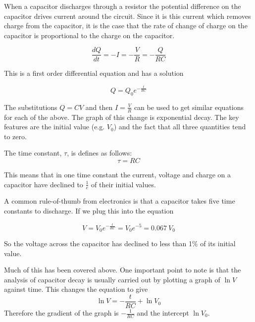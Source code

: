 \documentclass[revision-guide.tex]{subfiles}
\begin{document}

When a capacitor discharges through a resistor the potential difference on the capacitor drives current around the circuit. Since it is this current which removes charge from the capacitor, it is the case that the rate of change of charge on the capacitor is proportional to the charge on the capacitor.

\[ \frac{dQ}{dt} = -I = -\frac{V}{R} = -\frac{Q}{RC} \]

This is a first order differential equation and has a solution

\[ Q = Q_0 e^{-\frac{t}{RC}} \]

The substitutions $Q=CV$ and then $I = \frac{V}{R}$ can be used to get similar equations for each of the above. The graph of this change is exponential decay. The key features are the initial value (e.g. $V_0$) and the fact that all three quantities tend to zero.


The time constant, $\tau$, is defines as follows:
\[ \tau = RC \]

This means that in one time constant the current, voltage and charge on a capacitor have declined to $\frac{1}{e}$ of their initial values.

A common rule-of-thumb from electronics is that a capacitor takes five time constants to discharge. If we plug this into the equation

\[ V = V_0 e^{-\frac{t}{RC}} = V_0 e^{-5} = 0.067\ V_0 \]

So the voltage across the capacitor has declined to less than 1\% of its initial value.


Much of this has been covered above. One important point to note is that the analysis of capacitor decay is usually carried out by plotting a graph of $\ln{V}$ against time. This changes the equation to give
\[ \ln{V} = -\frac{t}{RC} + \ln{V_0} \]
Therefore the gradient of the graph is $-\frac{1}{RC}$ and the intercept $\ln{V_0}$.


\end{document}
